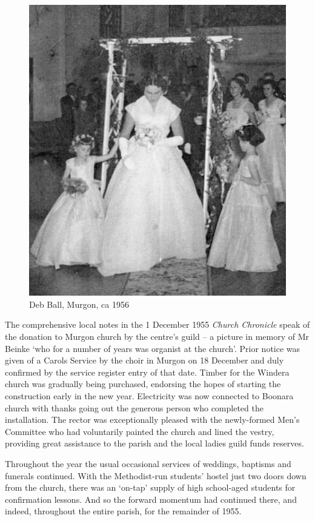 \begin{figure}
\begin{center}
\includegraphics[width=.9\linewidth,center]{../images/debBallMurgon.jpg}
\caption{Deb Ball, Murgon, ca 1956}
\end{center}
\end{figure}




The comprehensive local notes in the 1 December 1955 \emph{Church Chronicle} speak of the donation to Murgon church by the centre's guild -- a picture in memory of Mr Beinke `who for a number of years was organist at the church'. Prior notice was given of a Carols Service by the choir in Murgon on 18 December and duly confirmed by the service register entry of that date. Timber for the Windera church was gradually being purchased, endorsing the hopes of starting the construction early in the new year. Electricity was now connected to Boonara church with thanks going out the generous person who completed the installation. The rector was exceptionally pleased with the newly-formed Men's Committee who had voluntarily painted the church and lined the vestry, providing great assistance to the parish and the local ladies guild funds reserves.



Throughout the year the usual occasional services of weddings, baptisms and funerals continued. With the Methodist-run students' hostel just two doors down from the church, there was an `on-tap' supply of high school-aged students for confirmation lessons. And so the forward momentum had continued there, and indeed, throughout the entire parish, for the remainder of 1955.



